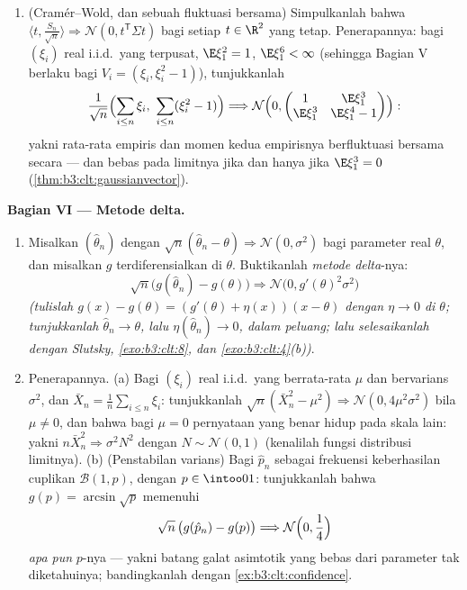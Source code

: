 \begin{problem}
\begin{enumerate}[resume]
  \item (Cramér--Wold, dan sebuah fluktuasi bersama) Simpulkanlah
        bahwa $\langle t, \frac{S_n}{\sqrt n}\rangle
        \Rightarrow \mathcal N(0, t^{\mathsf T}\Sigma t)$
        bagi setiap $t \in \R^2$ yang tetap. Penerapannya: bagi
        $(\xi_i)$ real i.i.d.\ yang terpusat, $\E\xi_1^2 = 1$,
        $\E\xi_1^6 < \infty$ (sehingga Bagian V berlaku bagi
        $V_i = (\xi_i, \xi_i^2 - 1)$), tunjukkanlah
        \[
        \frac1{\sqrt n}\Bigl(\sum_{i\leq n}\xi_i,\
        \sum_{i\leq n}(\xi_i^2 - 1)\Bigr) \Longrightarrow
        \mathcal N\Bigl(0, \begin{pmatrix} 1 & \E\xi_1^3\\
        \E\xi_1^3 & \E\xi_1^4 - 1\end{pmatrix}\Bigr) :
        \]
        yakni rata-rata empiris dan momen kedua empirisnya
        berfluktuasi bersama secara  --- dan bebas pada
        limitnya jika dan hanya jika $\E\xi_1^3 = 0$
        (\cref{thm:b3:clt:gaussianvector}).
\end{enumerate}

\medskip
\noindent\textbf{Bagian VI --- Metode delta.}
\begin{enumerate}[resume]
  \item Misalkan $(\hat\theta_n)$  dengan
        $\sqrt n(\hat\theta_n - \theta) \Rightarrow
        \mathcal N(0, \sigma^2)$ bagi parameter real
        $\theta$, dan misalkan $g$ terdiferensialkan di
        $\theta$. Buktikanlah \emph{metode delta}-nya:
        \[
        \sqrt n\bigl(g(\hat\theta_n) - g(\theta)\bigr)
        \Longrightarrow \mathcal N\bigl(0,
        g'(\theta)^2\sigma^2\bigr)
        \]
        \emph{(tulislah $g(x) - g(\theta) = (g'(\theta) +
        \eta(x))(x - \theta)$ dengan $\eta \to 0$ di
        $\theta$; tunjukkanlah $\hat\theta_n \to \theta$, lalu
        $\eta(\hat\theta_n) \to 0$, dalam peluang; lalu selesaikanlah
        dengan Slutsky, \cref{exo:b3:clt:8}, dan
        \cref{exo:b3:clt:4}(b))}.
  \item Penerapannya. (a) Bagi $(\xi_i)$ real i.i.d.\ yang
        berrata-rata $\mu$ dan bervarians $\sigma^2$, dan $\bar X_n =
        \frac1n\sum_{i\leq n}\xi_i$: tunjukkanlah $\sqrt n(\bar
        X_n^2 - \mu^2) \Rightarrow \mathcal N(0,
        4\mu^2\sigma^2)$ bila $\mu \neq 0$, dan bahwa bagi
        $\mu = 0$ pernyataan yang benar hidup pada skala lain:
        yakni $n\bar X_n^2 \Rightarrow \sigma^2N^2$ dengan
        $N \sim \mathcal N(0,1)$ (kenalilah fungsi distribusi
        limitnya). (b) (Penstabilan
        varians) Bagi $\hat p_n$ sebagai frekuensi keberhasilan
        cuplikan $\mathcal B(1, p)$, dengan $p \in \intoo01$:
        tunjukkanlah bahwa $g(p) = \arcsin\sqrt p$ memenuhi
        \[
        \sqrt n\,\bigl(g(\hat p_n) - g(p)\bigr)
        \Longrightarrow \mathcal N\Bigl(0, \frac14\Bigr)
        \]
        \emph{apa pun} $p$-nya --- yakni batang galat asimtotik yang
        bebas dari parameter tak diketahuinya; bandingkanlah dengan
        \cref{ex:b3:clt:confidence}.
\end{enumerate}


\end{problem}
